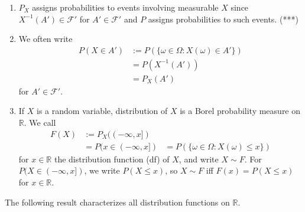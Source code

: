 \documentclass{article}
\newcommand{\R}{\mathbb{R}}
\newcommand{\inv}{^{-1}}
\begin{document}
	\begin{myrem}{}{}
		\begin{enumerate}
			\item $P_X$ assigns probabilities to events involving measurable $X$ since $X\inv(A')\in\mathcal{F}'$ for $A'\in\mathcal{F}'$ and $P$ assigns probabilities to such events. (***)
			
			\item We often write
			\begin{align*}
				P(X\in A')&:=P(\{\omega\in\Omega : X(\omega)\in A'\})\\
				&=P(X\inv(A'))\\
				&=P_X(A')
			\end{align*}
			for $A'\in\mathcal{F}'$.
			
			\item If $X$ is a random variable, distribution of $X$ is a Borel probability measure on $\R$. We call
			\begin{align*}
				F(X)&:=P_X((-\infty, x])\\
				&=P(x\in(-\infty, x])
				&=P(\{\omega\in\Omega : X(\omega)\leq x\})
			\end{align*}
			for $x\in\R$ the distribution function (df) of $X$, and write $X\sim F$. For $P(X\in(-\infty, x])$, we write $P(X\leq x)$, so $X\sim F$ iff $F(x)=P(X\leq x)$ for $x\in\R$.
		\end{enumerate}
	\end{myrem}
	
	The following result characterizes all distribution functions on $\R$.
	
\end{document}
